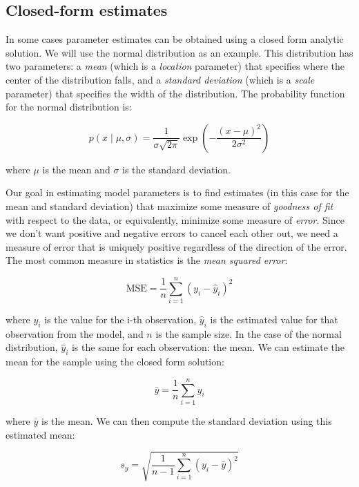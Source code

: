 \subsection{Closed-form estimates}

In some cases parameter estimates can be obtained using a closed form analytic solution.  We will use the normal distribution as an example.  This distribution has two parameters: a \textit{mean} (which is a \textit{location} parameter) that specifies where the center of the distribution falls, and a \textit{standard deviation} (which is a \textit{scale} parameter) that specifies the width of the distribution.  The probability function for the normal distribution is:

\begin{equation}
p(x \mid \mu, \sigma) = \frac{1}{\sigma \sqrt{2\pi}} \exp\left(-\frac{(x - \mu)^2}{2\sigma^2} \right)
\end{equation}

where $\mu$ is the mean and $\sigma$ is the standard deviation.

Our goal in estimating model parameters is to find estimates (in this case for the mean and standard deviation) that maximize some measure of \textit{goodness of fit} with respect to the data, or equivalently, minimize some measure of \textit{error}.  Since we don't want positive and negative errors to cancel each other out, we need a measure of error that is uniquely positive regardless of the direction of the error.  The most common measure in statistics is the \textit{mean squared error}:

\begin{equation}
\text{MSE} = \frac{1}{n} \sum_{i=1}^{n} (y_i - \hat{y}_i)^2
\end{equation}

where $y_i$ is the value for the i-th observation, $\hat{y}_i$ is the estimated value for that observation from the model, and $n$ is the sample size.  In the case of the normal distribution, $\hat{y}_i$ is the same for each observation: the mean.  We can
estimate the mean for the sample using the closed form solution:

\begin{equation}
\bar{y} = \frac{1}{n} \sum_{i=1}^{n} y_i
\end{equation}

where $\bar{y}$ is the mean.  We can then compute the standard deviation using this estimated mean:

\begin{equation}
s_y = \sqrt{\frac{1}{n-1} \sum_{i=1}^{n} (y_i - \bar{y})^2}
\end{equation}

